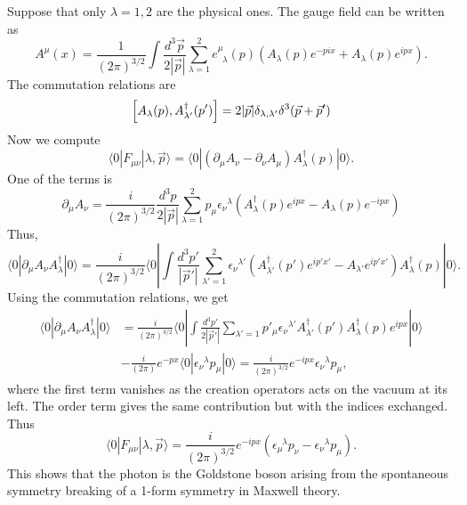 \documentclass{article}
\begin{document}
Suppose that only $\lambda=1,2$ are the physical ones. The gauge field can be written as 
\begin{equation}
	A^{\mu}(x)=\frac{1}{(2\pi)^{3/2}}\int \frac{d^3\vec{p}}{2|\vec{p}|}\sum_{\lambda=1}^2e^{\mu}_{\;\;\lambda}(p)(A_\lambda(p)e^{-pix}+A_\lambda(p)e^{ipx}).
\end{equation}
The commutation relations are
\begin{equation}
	\comm{A_\lambda(p)}{A^{\dagger}_{\lambda'}(p')}=2|\vec{p}|\delta_{\lambda,\lambda'}\delta^3(\vec{p}+\vec{p}')
\end{equation}
Now we compute 
\begin{equation}
	\langle 0|F_{\mu\nu}|\lambda,\vec{p}\rangle=\langle 0|(\partial_\mu A_\nu-\partial_\nu A_\mu)A_\lambda^{\dagger}(p)|0\rangle.
\end{equation}
One of the terms is 
\begin{equation}
	\partial_\mu A_{\nu}=\frac{i}{(2\pi)^{3/2}}\frac{d^3p}{2|\vec{p}|}\sum_{\lambda=1}^2p_\mu\epsilon_{\nu}^{\;\;\lambda}(A_\lambda^{\dagger}(p)e^{ipx}-A_{\lambda}(p)e^{-ipx})
\end{equation}
Thus, 
\begin{equation}
	\langle 0|\partial_{\mu}A_\nu A_\lambda^\dagger|0\rangle = \frac{i}{(2\pi)^{3/2}}\langle 0|\int\frac{d^3p'}{|\vec{p}'|}\sum_{\lambda'=1}^{2}\epsilon_\nu^{\;\;\lambda'}(A_{\lambda'}^{\dagger}(p')e^{ip'x'}-A_{\lambda'}e^{ip'x'})A_\lambda^{\dagger}(p)|0\rangle.
\end{equation}
Using the commutation relations, we get 
\begin{equation}
	\begin{split}
		\langle 0|\partial_{\mu}A_\nu A_\lambda^\dagger|0\rangle &= \frac{i}{(2\pi)^{3/2}}\langle 0|\int \frac{d^3p'}{2|\vec{p}'|}\sum_{\lambda'=1}p'_\mu\epsilon_\nu^{\;\;\lambda'}A_{\lambda'}^{\dagger}(p')A_\lambda^{\dagger}(p)e^{ipx}|0\rangle\\&
		-\frac{i}{(2\pi)}e^{-px}\langle 0|\epsilon_\nu^{\;\;\lambda}p_\mu|0\rangle = \frac{i}{(2\pi)^{3/2}}e^{-ipx}\epsilon_\nu^{\;\;\lambda}p_\mu,
	\end{split}
\end{equation}
where the first term vanishes as the creation operators acts on the vacuum at its left. The order term gives the same contribution but with the indices exchanged. Thus 
\begin{equation}
	\langle 0| F_{\mu\nu}|\lambda, \vec{p}\rangle = \frac{i}{(2\pi)^{3/2}}e^{-ipx}(\epsilon_\mu^{\;\;\lambda}p_\nu-\epsilon_\nu^{\;\;\lambda}p_\mu).
\end{equation}
This shows that the photon is the Goldstone boson arising from the spontaneous symmetry breaking of a 1-form symmetry in Maxwell theory. 
\end{document}
